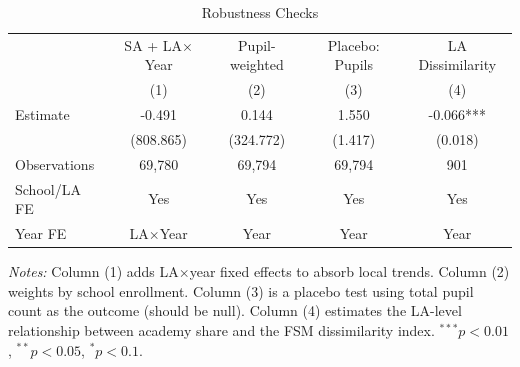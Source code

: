 \begin{table}[htbp]
\centering
\caption{Robustness Checks}
\label{tab:robust}
\begin{tabular}{lcccc}
\toprule
 & SA + LA$\times$Year & Pupil-weighted & Placebo: Pupils & LA Dissimilarity \\
 & (1) & (2) & (3) & (4) \\
\midrule
Estimate & -0.491 & 0.144 & 1.550 & -0.066*** \\
 & (808.865) & (324.772) & (1.417) & (0.018) \\
\midrule
Observations & 69,780 & 69,794 & 69,794 & 901 \\
School/LA FE & Yes & Yes & Yes & Yes \\
Year FE & LA$\times$Year & Year & Year & Year \\
\bottomrule
\end{tabular}
\begin{tablenotes}
\item \textit{Notes:} Column (1) adds LA$\times$year fixed effects to absorb local trends. Column (2) weights by school enrollment. Column (3) is a placebo test using total pupil count as the outcome (should be null). Column (4) estimates the LA-level relationship between academy share and the FSM dissimilarity index. $^{***}p<0.01$, $^{**}p<0.05$, $^{*}p<0.1$.
\end{tablenotes}
\end{table}

